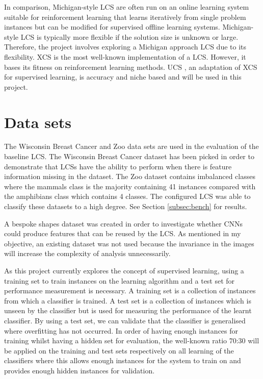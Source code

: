 In comparison, Michigan-style LCS are often run on an online learning system suitable for reinforcement learning that learns iteratively from single problem instances but can be modified for supervised offline learning systems. Michigan-style LCS is typically more flexible if the solution size is unknown or large. Therefore, the project involves exploring a Michigan approach LCS due to its flexibility. XCS is the most well-known implementation of a LCS. However, it bases its fitness on reinforcement learning methods. UCS \cite{urbanowicz2017introduction}, an adaptation of XCS for supervised learning, is accuracy and niche based and will be used in this project. 

\section{Data sets} \label{subsec:datasets}
The Wisconsin Breast Cancer \cite{wisconsinbreast} and Zoo \cite{zoodata} data sets are used in the evaluation of the baseline LCS. The Wisconsin Breast Cancer dataset has been picked in order to demonstrate that LCSs have the ability to perform when there is feature information missing in the dataset. The Zoo dataset contains imbalanced classes where the mammals class is the majority containing 41 instances compared with the amphibians class which contains 4 classes. The configured LCS was able to classify these datasets to a high degree. See Section \ref{subsec:bench} for results. 

A bespoke shapes dataset was created in order to investigate whether CNNs could produce features that can be reused by the LCS. As mentioned in my objective, an existing dataset was not used because the invariance in the images will increase the complexity of analysis unnecessarily. 

As this project currently explores the concept of supervised learning, using a training set to train instances on the learning algorithm and a test set for performance measurement is necessary. A training set is a collection of instances from which a classifier is trained. A test set is a collection of instances which is unseen by the classifier but is used for measuring the performance of the learnt classifier. By using a test set, we can validate that the classifier is generalised where overfitting has not occurred. In order of having enough instances for training whilst having a hidden set for evaluation, the well-known ratio 70:30 will be applied on the training and test sets respectively on all learning of the classifiers where this allows enough instances for the system to train on and provides enough hidden instances for validation.

